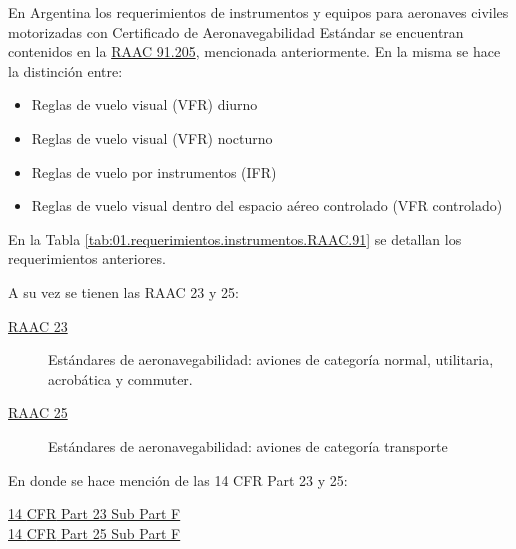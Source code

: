 En Argentina los requerimientos de instrumentos y equipos para aeronaves  civiles  motorizadas  con  Certificado de Aeronavegabilidad Estándar se encuentran contenidos en la \href{}{RAAC 91.205}, mencionada anteriormente.
En la misma se hace la distinci\'on entre:

\begin{itemize}
    \item Reglas de vuelo visual (VFR) diurno
    \item Reglas  de  vuelo  visual  (VFR)  nocturno
    \item Reglas de vuelo por instrumentos (IFR)
    \item Reglas de vuelo visual dentro del espacio aéreo controlado (VFR controlado)
\end{itemize}

En la Tabla \ref{tab:01.requerimientos.instrumentos.RAAC.91} se detallan los requerimientos anteriores.


A su vez se tienen las RAAC 23 y 25:

\begin{description}
\item[\href{https://www.anac.gov.ar/anac/web/uploads/upcg/raac/raac-23.pdf}{RAAC 23}] Estándares de aeronavegabilidad: aviones de categoría normal, utilitaria, acrobática y commuter.
\item[\href{https://www.anac.gov.ar/anac/web/uploads/upcg/raac/raac-25.pdf}{RAAC 25}]  Estándares de aeronavegabilidad: aviones de categoría transporte
\end{description}

En donde se hace mención de las 14 \ac{CFR} Part 23 y 25:

\begin{description}
\item[\href{https://www.law.cornell.edu/cfr/text/14/part-23/subpart-F}{14 \ac{CFR} Part 23 Sub Part F}]
\item[\href{https://www.law.cornell.edu/cfr/text/14/part-25/subpart-F}{14 \ac{CFR} Part 25 Sub Part F}] 
\end{description}

\newpage

